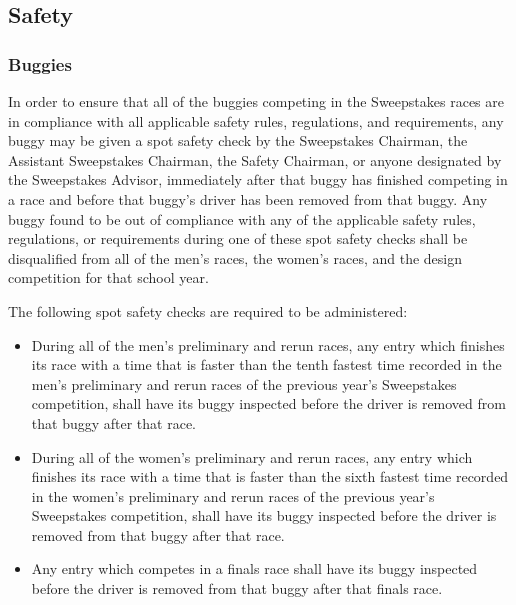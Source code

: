 \subsection{Safety}

\subsubsection{Buggies}

	In order to ensure that all of the buggies competing in the Sweepstakes races
	are in compliance with all applicable safety rules, regulations, and
	requirements, any buggy may be given a spot safety check by the Sweepstakes
	Chairman, the Assistant Sweepstakes Chairman, the Safety Chairman, or anyone
	designated by the Sweepstakes Advisor, immediately after that buggy has
	finished competing in a race and before that buggy's driver has been removed
	from that buggy. Any buggy found to be out of compliance with any of the
	applicable safety rules, regulations, or requirements during one of these spot
	safety checks shall be disqualified from all of the men's races, the women's
	races, and the design competition for that school year.
	\newline

	\noindent The following spot safety checks are required to be administered:

	\begin{itemize}

		\item
		During all of the men's preliminary and rerun races, any entry which finishes
		its race with a time that is faster than the tenth fastest time recorded in the
		men's preliminary and rerun races of the previous year's Sweepstakes
		competition, shall have its buggy inspected before the driver is removed from
		that buggy after that race.

		\item
		During all of the women's preliminary and rerun races, any entry which finishes
		its race with a time that is faster than the sixth fastest time recorded in the
		women's preliminary and rerun races of the previous year's Sweepstakes
		competition, shall have its buggy inspected before the driver is removed from
		that buggy after that race.

		\item
		Any entry which competes in a finals race shall have its buggy inspected before
		the driver is removed from that buggy after that finals race.

	\end{itemize}

